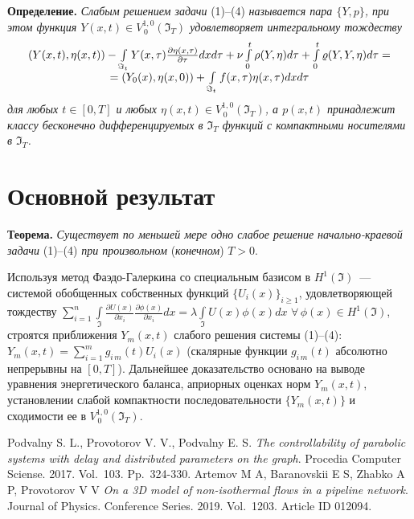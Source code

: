 \textbf{Определение.} \emph{Слабым  решением задачи} (1)--(4) \emph{называется пара $\{Y,p\}$, при этом функция  $Y(x,t)\in V_{\,0}^{1,0}(\Im_{T})$  удовлетворяет интегральному тождеству}
\[
{{\begin{array}{*{20}c}
(Y(x,t),\eta(x,t))-\int\limits_{\Im_t}Y(x,\tau)\frac{\partial\eta(x,\tau)}{\partial \tau}dxd\tau+
\nu\int\limits_0^t\rho(Y,\eta)d\tau+\int\limits_0^t\varrho(Y,Y,\eta)d\tau=
\\
=(Y_0(x),\eta(x,0))+\int\limits_{\Im_t}f(x,\tau)\eta(x,\tau)dxd\tau
\end{array} }}
\]
\emph{для любых $t\in[0,T]$ и любых $\eta(x,t)\in V_{\,0}^{1,0}(\Im_{T})$, а $p(x,t)$ принадлежит классу бесконечно дифференцируемых в $\Im_T$ функций с компактными носителями в $\Im_T$.}



\section{Основной результат} %


\textbf{Теорема.} \emph{Существует по меньшей мере одно слабое   решение начально-краевой задачи } (1)--(4) \emph{при произвольном} (\emph{конечном}) $T>0$.

Используя метод Фаэдо-Галеркина со специальным базисом в $H^1(\Im)$~--- системой обобщенных собственных функций $\{U_i(x)\}_{i\geq1}$, удовлетворяющей тождеству $\sum\limits_{i=1}^n \int\limits_\Im\frac{\partial U(x)}{\partial x_i}\frac{\partial \phi(x)}{\partial x_i}dx= \lambda \int\limits_\Im U(x)\phi(x)dx$ $\forall \,\phi(x)\in H^1(\Im)$, строятся приближения $Y_m(x,t)$ слабого решения системы (1)--(4): $Y_m(x,t)= \sum\limits_{i=1}^m g_{i\,m}(t)U_i(x)$ (скалярные функции $g_{i\,m}(t)$ абсолютно непрерывны на $[0,T]$). Дальнейшее доказательство основано на выводе уравнения энергетического баланса, априорных оценках норм $Y_m(x,t)$, установлении слабой компактности последовательности $\{Y_m(x,t)\}$ и сходимости ее в $V_{\,0}^{1,0}(\Im_{T})$.



\begin{thebibliography}{99}
Podvalny S. L., Provotorov V. V., Podvalny E. S.  {\it The controllability of parabolic
systems with delay and distributed parameters on the graph}. Procedia Computer Sciense.
2017. Vol.~103. Pp.~324-330.
Artemov M A,  Baranovskii E S, Zhabko A P,  Provotorov V V  {\it On a 3D model of non-isothermal flows in a pipeline network}. Journal of Physics. Conference Series.
2019. Vol.~1203. Article ID 012094.
\end{thebibliography}






%

